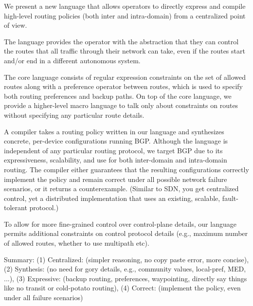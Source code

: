 We present a new language that allows operators to directly express and compile high-level routing policies (both inter and intra-domain) from a centralized point of view.

The language provides the operator with the abstraction that they can control the routes that all traffic through their network can take, even if the routes start and/or end in a different autonomous system.

The core language consists of regular expression constraints on the set of allowed routes along with a preference operator between routes, which is used to specify both routing preferences and backup paths.
On top of the core language, we provide a higher-level macro language to talk only about constraints on routes without specifying any particular route details.
	
A compiler takes a routing policy written in our language and synthesizes concrete, per-device configurations running BGP. Although the language is independent of any particular routing protocol, we target BGP due to its expressiveness, scalability, and use for both inter-domain and intra-domain routing.
The compiler either guarantees that the resulting configurations correctly implement the policy and remain correct under all possible network failure scenarios, or it returns a counterexample.
(Similar to SDN, you get centralized control, yet a distributed implementation that uses an existing, scalable, fault-tolerant protocol.)

To allow for more fine-grained control over control-plane details, our language permits additional constraints on control protocol details (e.g., maximum number of allowed routes, whether to use multipath etc).


Summary:
	 (1) Centralized: (simpler reasoning, no copy paste error, more concise),
	 (2) Synthesis: (no need for gory details, e.g., community values, local-pref, MED, ...),
	 (3) Expressive: (backup routing, preferences, waypointing, directly say things like no transit or cold-potato routing),
	 (4) Correct: (implement the policy, even under all failure scenarios)


